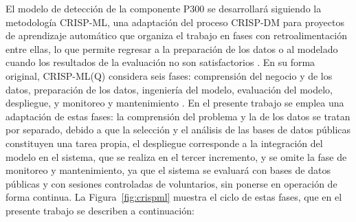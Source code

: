 El modelo de detección de la componente P300 se desarrollará siguiendo la metodología CRISP-ML,
una adaptación del proceso CRISP-DM para proyectos de aprendizaje automático que organiza el
trabajo en fases con retroalimentación entre ellas, lo que permite regresar a la
preparación de los datos o al modelado cuando los resultados de la evaluación no son
satisfactorios \cite{studer2021}. En su forma original, CRISP-ML(Q) considera seis fases:
comprensión del negocio y de los datos, preparación de los datos, ingeniería del modelo,
evaluación del modelo, despliegue, y monitoreo y mantenimiento \cite{studer2021}. En el presente
trabajo se emplea una adaptación de estas fases: la comprensión del problema y la de los datos se
tratan por separado, debido a que la selección y el análisis de las bases de datos públicas
constituyen una tarea propia, el despliegue corresponde a la integración del modelo en el sistema,
que se realiza en el tercer incremento, y se omite la fase de monitoreo y mantenimiento, ya que el
sistema se evaluará con bases de datos públicas y con sesiones controladas de voluntarios, sin ponerse en operación de forma
continua. La Figura~\ref{fig:crispml} muestra el ciclo de estas fases, que en el presente trabajo
se describen a continuación:


